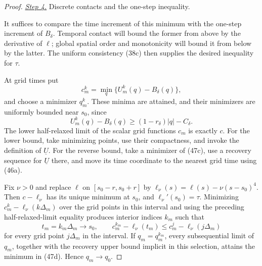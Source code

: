 \documentclass{smfart}
\theoremstyle{definition}
\newcommand{\1}{\mathbf 1}
\begin{document}
\begin{proof}
\smallskip\noindent
\underline{\textit{Step 4.}} Discrete contacts and the one-step inequality.

It suffices to compare the time increment of this minimum with the
one-step increment of $B_\delta$.  Temporal contact will bound the
former from above by the derivative of $\ell$; global spatial order
and monotonicity will bound it from below by the latter.  The uniform
consistency (38c) then supplies the desired inequality for $\tau$.

At grid times put
\begin{equation}
c_ m^k=\min_ q\{U_ m^k(q)-B_ \delta(q)\},
\tag{47g}
\end{equation}
and choose a minimizer $q_ m^k$.  These minima are attained, and their
minimizers are uniformly bounded near $s_ 0$, since
\begin{equation*}
U_ m^k(q)-B_ \delta(q)
\geq(1-r_ \delta)|q|-C_ \delta.
\end{equation*}
The lower half-relaxed limit of the scalar grid functions $c_ m$ is
exactly $c$.  For the lower bound, take minimizing points, use their
compactness, and invoke the definition of $\underline U$.  For the
reverse bound, take a minimizer of (47c), use a recovery sequence for
$\underline U$ there, and move its time coordinate to the nearest
grid time using (46a).

Fix $\nu>0$ and replace $\ell$ on
$[s_ 0-r,s_ 0+r]$ by
$\ell_ \nu(s)=\ell(s)-\nu(s-s_ 0)^4$.  Then
$c-\ell_ \nu$ has its unique minimum at $s_ 0$, and
$\ell_ \nu'(s_ 0)=\tau$.  Minimizing
$c_ m^k-\ell_ \nu(k\Delta_ m)$ over the grid points in this interval
and using the preceding half-relaxed-limit equality produces interior
indices $k_ m$ such that
\begin{equation}
t_ m=k_ m\Delta_ m\longrightarrow s_ 0,\qquad
c_ m^{k_ m}-\ell_ \nu(t_ m)
\leq c_ m^j-\ell_ \nu(j\Delta_ m)
\tag{47h}
\end{equation}
for every grid point $j\Delta_ m$ in the interval.  If
$q_ m=q_ m^{k_ m}$, every subsequential limit of $q_ m$, together with
the recovery upper bound implicit in this selection, attains the
minimum in (47d).  Hence $q_ m\to q_ 0$.


\end{proof}
\end{document}
